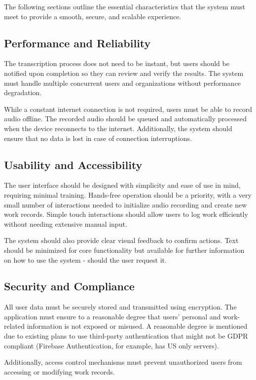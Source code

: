 \documentclass[
  digital,     %
  oneside,     %
  nosansbold,  %
  nocolorbold, %
  lof,         %
  lot,         %
]{fithesis4}
\begin{document}
The following sections outline the essential characteristics that the system must meet to provide a smooth, secure, and scalable experience.

\subsection{Performance and Reliability}  
The transcription process does not need to be instant, but users should be notified upon completion so they can review and verify the results. The system must handle multiple concurrent users and organizations without performance degradation.

While a constant internet connection is not required, users must be able to record audio offline. The recorded audio should be queued and automatically processed when the device reconnects to the internet. Additionally, the system should ensure that no data is lost in case of connection interruptions.

\subsection{Usability and Accessibility}  
The user interface should be designed with simplicity and ease of use in mind, requiring minimal training. Hands-free operation should be a priority, with a very small number of interactions needed to initialize audio recording and create new work records. Simple touch interactions should allow users to log work efficiently without needing extensive manual input.

The system should also provide clear visual feedback to confirm actions. Text should be minimized for core functionality but available for further information on how to use the system - should the user request it.

\subsection{Security and Compliance}  
All user data must be securely stored and transmitted using encryption. The application must ensure to a reasonable degree that users’ personal and work-related information is not exposed or misused. A reasonable degree is mentioned due to existing plans to use third-party authentication that might not be GDPR compliant (Firebase Authentication, for example, has US only servers).

Additionally, access control mechanisms must prevent unauthorized users from accessing or modifying work records.
\end{document}
